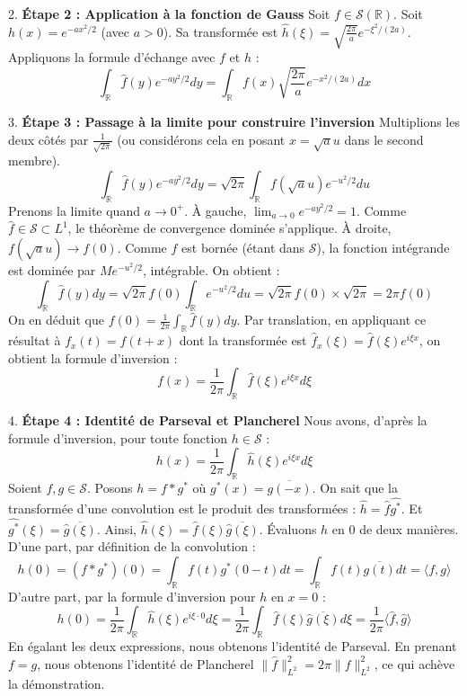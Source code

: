 \documentclass[11pt,a4paper]{article}
\begin{document}
2. \textbf{Étape 2 : Application à la fonction de Gauss}
Soit $f \in \mathcal{S}(\mathbb{R})$. Soit $h(x) = e^{-a x^2 / 2}$ (avec $a > 0$).
Sa transformée est $\hat{h}(\xi) = \sqrt{\frac{2\pi}{a}} e^{-\xi^2 / (2a)}$.
Appliquons la formule d'échange avec $f$ et $h$ :
$$ \int_{\mathbb{R}} \hat{f}(y) e^{-a y^2 / 2} dy = \int_{\mathbb{R}} f(x) \sqrt{\frac{2\pi}{a}} e^{-x^2 / (2a)} dx $$

3. \textbf{Étape 3 : Passage à la limite pour construire l'inversion}
Multiplions les deux côtés par $\frac{1}{\sqrt{2\pi}}$ (ou considérons cela en posant $x = \sqrt{a} u$ dans le second membre).
$$ \int_{\mathbb{R}} \hat{f}(y) e^{-a y^2 / 2} dy = \sqrt{2\pi} \int_{\mathbb{R}} f(\sqrt{a}u) e^{-u^2/2} du $$
Prenons la limite quand $a \to 0^+$.
À gauche, $\lim_{a \to 0} e^{-a y^2 / 2} = 1$. Comme $\hat{f} \in \mathcal{S} \subset L^1$, le théorème de convergence dominée s'applique.
À droite, $f(\sqrt{a}u) \to f(0)$. Comme $f$ est bornée (étant dans $\mathcal{S}$), la fonction intégrande est dominée par $M e^{-u^2/2}$, intégrable.
On obtient :
$$ \int_{\mathbb{R}} \hat{f}(y) dy = \sqrt{2\pi} f(0) \int_{\mathbb{R}} e^{-u^2/2} du = \sqrt{2\pi} f(0) \times \sqrt{2\pi} = 2\pi f(0) $$
On en déduit que $f(0) = \frac{1}{2\pi} \int_{\mathbb{R}} \hat{f}(y) dy$.
Par translation, en appliquant ce résultat à $f_x(t) = f(t+x)$ dont la transformée est $\hat{f}_x(\xi) = \hat{f}(\xi)e^{i\xi x}$, on obtient la formule d'inversion :
$$ f(x) = \frac{1}{2\pi} \int_{\mathbb{R}} \hat{f}(\xi) e^{i\xi x} d\xi $$

4. \textbf{Étape 4 : Identité de Parseval et Plancherel}
Nous avons, d'après la formule d'inversion, pour toute fonction $h \in \mathcal{S}$ :
$$ h(x) = \frac{1}{2\pi} \int_{\mathbb{R}} \hat{h}(\xi) e^{i\xi x} d\xi $$
Soient $f, g \in \mathcal{S}$. Posons $h = f * g^*$ où $g^*(x) = \overline{g(-x)}$.
On sait que la transformée d'une convolution est le produit des transformées : $\hat{h} = \hat{f} \widehat{g^*}$.
Et $\widehat{g^*}(\xi) = \overline{\hat{g}(\xi)}$.
Ainsi, $\hat{h}(\xi) = \hat{f}(\xi) \overline{\hat{g}(\xi)}$.
Évaluons $h$ en 0 de deux manières.
D'une part, par définition de la convolution :
$$ h(0) = (f * g^*)(0) = \int_{\mathbb{R}} f(t) g^*(0-t) dt = \int_{\mathbb{R}} f(t) \overline{g(t)} dt = \langle f, g \rangle $$
D'autre part, par la formule d'inversion pour $h$ en $x=0$ :
$$ h(0) = \frac{1}{2\pi} \int_{\mathbb{R}} \hat{h}(\xi) e^{i\xi \cdot 0} d\xi = \frac{1}{2\pi} \int_{\mathbb{R}} \hat{f}(\xi) \overline{\hat{g}(\xi)} d\xi = \frac{1}{2\pi} \langle \hat{f}, \hat{g} \rangle $$
En égalant les deux expressions, nous obtenons l'identité de Parseval. En prenant $f = g$, nous obtenons l'identité de Plancherel $\|\hat{f}\|_{L^2}^2 = 2\pi \|f\|_{L^2}^2$, ce qui achève la démonstration.
\end{document}
